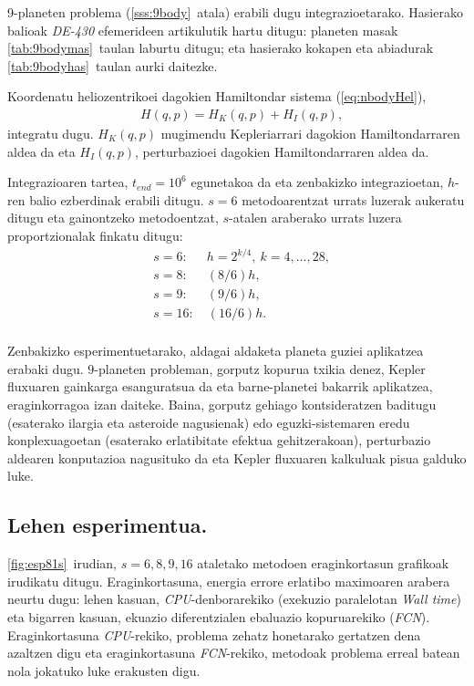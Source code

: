 9-planeten problema (\ref{sss:9body}~atala) erabili dugu integrazioetarako. Hasierako balioak \emph{DE-430} efemerideen artikulutik hartu ditugu: planeten masak  \ref{tab:9bodymas}~taulan laburtu ditugu; eta hasierako kokapen eta abiadurak \ref{tab:9bodyhas}~taulan aurki daitezke.

Koordenatu heliozentrikoei dagokien  Hamiltondar sistema (\ref{eq:nbodyHel}),
\begin{align*}
&H(q,p)=H_K(q,p)+H_I(q,p),
\end{align*}
integratu dugu. $H_K(q,p)$ mugimendu Kepleriarrari dagokion Hamiltondarraren aldea da  eta $H_I(q,p)$, perturbazioei dagokien Hamiltondarraren aldea da. 

Integrazioaren tartea, $t_{end}=10^6$ egunetakoa da eta zenbakizko integrazioetan, $h$-ren balio ezberdinak erabili ditugu. $s=6$ metodoarentzat urrats luzerak aukeratu ditugu eta gainontzeko metodoentzat, $s$-atalen araberako urrats luzera proportzionalak finkatu ditugu:
\begin{align*}
&s=6: \quad  \ \ h=2^{k/4}, \ k=4,\dots,28, \\
&s=8: \quad  \ \ (8/6)h, \\
&s=9: \quad  \ \ (9/6)h, \\
&s=16: \quad (16/6)h. \\
\end{align*} 

Zenbakizko esperimentuetarako, aldagai aldaketa planeta guziei aplikatzea erabaki dugu. $9$-planeten probleman, gorputz kopurua txikia denez,  Kepler fluxuaren gainkarga esanguratsua da eta  barne-planetei bakarrik aplikatzea, eraginkorragoa izan daiteke. Baina, gorputz gehiago kontsideratzen baditugu (esaterako ilargia eta asteroide nagusienak) edo eguzki-sistemaren eredu konplexuagoetan (esaterako erlatibitate efektua gehitzerakoan), perturbazio aldearen konputazioa nagusituko da eta Kepler fluxuaren kalkuluak pisua galduko luke. 


\subsection*{Lehen esperimentua.}


\ref{fig:esp81s}~irudian, $s=6,8,9,16$ ataletako metodoen eraginkortasun grafikoak irudikatu ditugu. Eraginkortasuna, energia errore erlatibo maximoaren arabera neurtu dugu: lehen kasuan, \emph{CPU}-denborarekiko (exekuzio paralelotan \emph{Wall time}) eta bigarren kasuan, ekuazio diferentzialen ebaluazio kopuruarekiko (\emph{FCN}). Eraginkortasuna \emph{CPU}-rekiko, problema zehatz honetarako gertatzen dena azaltzen digu eta eraginkortasuna \emph{FCN}-rekiko, metodoak problema erreal batean nola jokatuko luke erakusten digu. 


